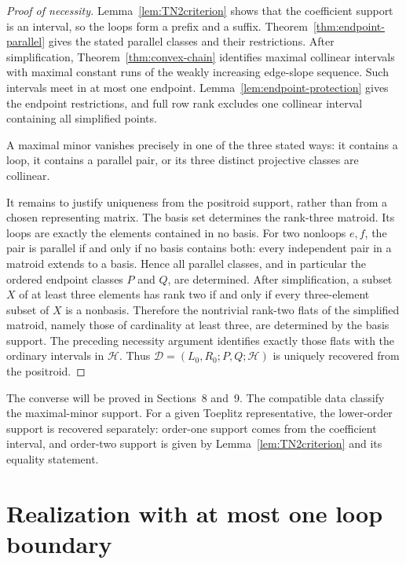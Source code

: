 \documentclass{amsart}
\numberwithin{equation}{section}
\theoremstyle{definition}
\theoremstyle{remark}
\begin{document}
\begin{proof}[Proof of necessity]
Lemma~\ref{lem:TN2criterion} shows that the coefficient support is an interval, so the loops form a prefix and a suffix.  Theorem~\ref{thm:endpoint-parallel} gives the stated parallel classes and their restrictions.  After simplification, Theorem~\ref{thm:convex-chain} identifies maximal collinear intervals with maximal constant runs of the weakly increasing edge-slope sequence.  Such intervals meet in at most one endpoint.  Lemma~\ref{lem:endpoint-protection} gives the endpoint restrictions, and full row rank excludes one collinear interval containing all simplified points.

A maximal minor vanishes precisely in one of the three stated ways: it contains a loop, it contains a parallel pair, or its three distinct projective classes are collinear.

It remains to justify uniqueness from the positroid support, rather than from a chosen representing matrix.  The basis set determines the rank-three matroid.  Its loops are exactly the elements contained in no basis.  For two nonloops $e,f$, the pair is parallel if and only if no basis contains both: every independent pair in a matroid extends to a basis.  Hence all parallel classes, and in particular the ordered endpoint classes $P$ and $Q$, are determined.  After simplification, a subset $X$ of at least three elements has rank two if and only if every three-element subset of $X$ is a nonbasis.  Therefore the nontrivial rank-two flats of the simplified matroid, namely those of cardinality at least three, are determined by the basis support.  The preceding necessity argument identifies exactly those flats with the ordinary intervals in $\mathcal H$.  Thus $\mathcal D=(L_0,R_0;P,Q;\mathcal H)$ is uniquely recovered from the positroid.
\end{proof}

The converse will be proved in Sections~8 and~9.  The compatible data classify the maximal-minor support.  For a given Toeplitz representative, the lower-order support is recovered separately: order-one support comes from the coefficient interval, and order-two support is given by Lemma~\ref{lem:TN2criterion} and its equality statement.

\section{Realization with at most one loop boundary}
\end{document}
